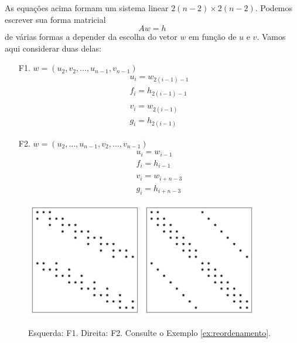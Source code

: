 \begin{ex}
  As equações acima formam um sistema linear $2(n-2)\times 2(n-2)$. Podemos escrever sua forma matricial
  \begin{equation}
    Aw = h
  \end{equation}
  de várias formas a depender da escolha do vetor $w$ em função de $u$ e $v$. Vamos aqui considerar duas delas:
  \begin{itemize}
  \item[F1.] $w = (u_2,v_2,\dotsc,u_{n-1},v_{n-1})$
    \begin{gather}
      u_i = w_{2(i-1)-1}\\
      f_i = h_{2(i-1)-1}\\
      ~\nonumber\\
      v_i = w_{2(i-1)}\\
      g_i = h_{2(i-1)}
    \end{gather}
  \item[F2.] $w = (u_2,\dotsc,u_{n-1},v_2,\dotsc,v_{n-1})$
    \begin{gather}
      u_i = w_{i-1}\\
      f_i = h_{i-1}\\
      ~\nonumber\\
      v_i = w_{i+n-3}\\
      g_i = h_{i+n-3}
    \end{gather}    
  \end{itemize}

  
\begin{figure}[H]
  \centering
  \includegraphics[width=0.45\textwidth]{./cap_sislin/dados/figExReordenamento/f1}
  \includegraphics[width=0.45\textwidth]{./cap_sislin/dados/figExReordenamento/f2}
  \caption{Esquerda: F1. Direita: F2. Consulte o Exemplo \ref{ex:reordenamento}.}
  \label{fig:exReordenamento}
\end{figure}


\end{ex}
